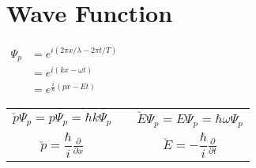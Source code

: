 \documentclass[12pt]{article}
\begin{document}
\section{Wave Function}

\vspace{5pt}\noindent
\(\begin{aligned}
    \Psi_p &= e^{ i( 2 \pi x/ \lambda - 2 \pi t/T ) }\\
    &= e^{ i(k x- \omega t) }\\
    &= e^{ \frac{i}{\hbar} ( p x - E t ) }
\end{aligned}\)
\hspace{27pt} \vline \hspace{15pt}
\begin{tabular}{c m{.5cm} c}
    \( \breve{p} \Psi_p = p \Psi_p = \hbar k \Psi_p \) 
        &
        & \( \breve{E} \Psi_p = E \Psi_p = \hbar \omega \Psi_p \)
        \\[5pt] 
    \( \boxed{ \breve{p} = \dfrac{\hbar}{i} \frac{\partial}{\partial x} } \) 
        &
        &\( \boxed{ \breve{E} = -\dfrac{\hbar}{i} \frac{\partial}{\partial t} } \)
\end{tabular}
\end{document}
